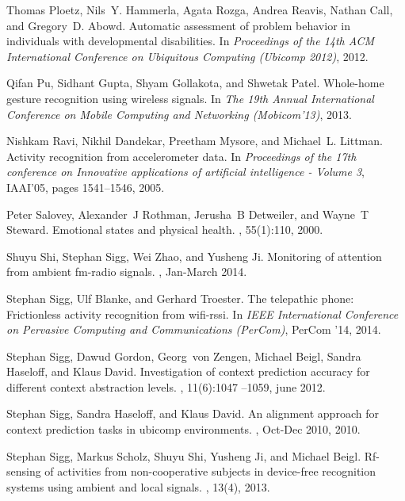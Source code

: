 \documentclass[12pt]{article}
\begin{document}
\begin{thebibliography}{10}
Thomas Ploetz, Nils~Y. Hammerla, Agata Rozga, Andrea Reavis, Nathan Call, and
  Gregory~D. Abowd.
\newblock Automatic assessment of problem behavior in individuals with
  developmental disabilities.
\newblock In {\em Proceedings of the 14th ACM International Conference on
  Ubiquitous Computing (Ubicomp 2012)}, 2012.

Qifan Pu, Sidhant Gupta, Shyam Gollakota, and Shwetak Patel.
\newblock Whole-home gesture recognition using wireless signals.
\newblock In {\em The 19th Annual International Conference on Mobile Computing
  and Networking (Mobicom'13)}, 2013.

Nishkam Ravi, Nikhil Dandekar, Preetham Mysore, and Michael~L. Littman.
\newblock Activity recognition from accelerometer data.
\newblock In {\em Proceedings of the 17th conference on Innovative applications
  of artificial intelligence - Volume 3}, IAAI'05, pages 1541--1546, 2005.

Peter Salovey, Alexander~J Rothman, Jerusha~B Detweiler, and Wayne~T Steward.
\newblock Emotional states and physical health.
, 55(1):110, 2000.

Shuyu Shi, Stephan Sigg, Wei Zhao, and Yusheng Ji.
\newblock Monitoring of attention from ambient fm-radio signals.
, Jan-March 2014.

Stephan Sigg, Ulf Blanke, and Gerhard Troester.
\newblock The telepathic phone: Frictionless activity recognition from
  wifi-rssi.
\newblock In {\em IEEE International Conference on Pervasive Computing and
  Communications (PerCom)}, PerCom '14, 2014.

Stephan Sigg, Dawud Gordon, Georg~von Zengen, Michael Beigl, Sandra Haseloff,
  and Klaus David.
\newblock Investigation of context prediction accuracy for different context
  abstraction levels.
, 11(6):1047 --1059, june
  2012.

Stephan Sigg, Sandra Haseloff, and Klaus David.
\newblock An alignment approach for context prediction tasks in ubicomp
  environments.
, Oct-Dec 2010, 2010.

Stephan Sigg, Markus Scholz, Shuyu Shi, Yusheng Ji, and Michael Beigl.
\newblock Rf-sensing of activities from non-cooperative subjects in device-free
  recognition systems using ambient and local signals.
, 13(4), 2013.


\end{thebibliography}
\end{document}
